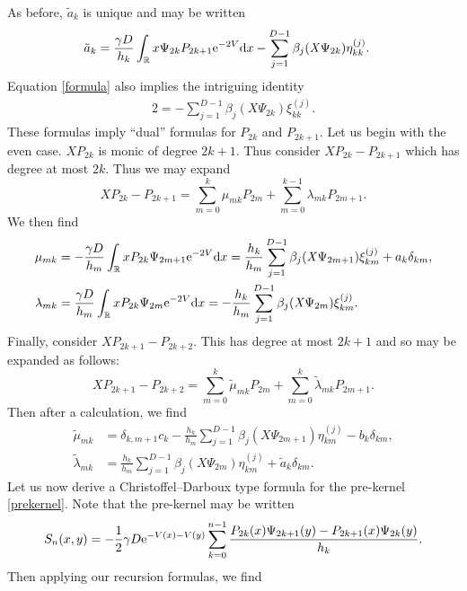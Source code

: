\documentclass[pdftex]{sigma}
\numberwithin{equation}{section}
\begin{document}
As before, $\tilde{a}_k$ is unique and may be written
\begin{align*}
\tilde{a}_k &= \frac{\gamma D}{h_k}\int_\mathbb{R} x \Psi_{2k} P_{2k+1} {\rm e}^{-2V} {\rm d}x - \sum_{j=1}^{D-1} \beta_j(\mathit{X}\Psi_{2k} ) \eta^{(j)}_{kk}.
\end{align*}
Equation \eqref{formula} also implies the intriguing identity
\begin{align}\label{intriguing}
2 = - \sum_{j=1}^{D-1} \beta_j(\mathit{X}\Psi_{2k} ) \xi_{kk}^{(j)}.
\end{align}
These formulas imply \enquote{dual} formulas for $P_{2k}$ and $P_{2k+1}$. Let us begin with the even case. $\mathit{X} P_{2k}$ is monic of degree $2k+1$. Thus consider $\mathit{X} P_{2k} - P_{2k+1}$ which has degree at most $2k$. Thus we may expand
\[
\mathit{X} P_{2k} - P_{2k+1} = \sum_{m= 0}^{k} \mu_{mk} P_{2m} + \sum_{m = 0}^{k-1} \lambda_{mk} P_{2m+1}.
\]
We then find
\begin{align*}
\mu_{mk} &= -\frac{\gamma D}{h_m} \int_\mathbb{R} x P_{2k} \Psi_{2m+1} {\rm e}^{-2V} {\rm d}x = \frac{h_k}{h_m} \sum_{j=1}^{D-1} \beta_j(\mathit{X} \Psi_{2m+1}) \xi_{km}^{(j)} + a_k \delta_{km}, \\
\lambda_{mk} & = \frac{\gamma D}{h_m}\int_\mathbb{R} x P_{2k} \Psi_{2m} {\rm e}^{-2V} {\rm d}x = - \frac{h_k}{h_m} \sum_{j=1}^{D-1} \beta_j( \mathit{X} \Psi_{2m})\xi_{km}^{(j)}.
\end{align*}
Finally, consider $ \mathit{X} P_{2k+1} - P_{2k+2}$. This has degree at most $2k+1$ and so may be expanded as follows:
\[
 \mathit{X} P_{2k+1} - P_{2k+2} = \sum_{m=0}^k \tilde{\mu}_{mk} P_{2m} + \sum_{m=0}^k \tilde{\lambda}_{mk} P_{2m+1}.
\]
Then after a calculation, we find
\begin{align*}
\tilde{\mu}_{mk} &= \delta_{k,m+1}c_k - \frac{h_k}{h_m} \sum_{j=1}^{D-1} \beta_j(\mathit{X} \Psi_{2m+1}) \eta_{km}^{(j)} - b_k \delta_{km} , \\
\tilde{\lambda}_{mk} &= \frac{h_k}{h_m} \sum_{j=1}^{D-1} \beta_j (\mathit{X} \Psi_{2m}) \eta_{km}^{(j)} + \tilde{a}_k \delta_{km}.
\end{align*}
Let us now derive a Christoffel--Darboux type formula for the pre-kernel \eqref{prekernel}. Note that the pre-kernel may be written
\begin{equation*}
S_n(x,y) = - \frac{1}{2} \gamma D {\rm e}^{-V(x) - V(y)} \sum_{k=0}^{n-1} \frac{P_{2k}(x) \Psi_{2k+1}(y) - P_{2k+1}(x) \Psi_{2k}(y)}{h_k}.
\end{equation*}
Then applying our recursion formulas, we find
\end{document}
